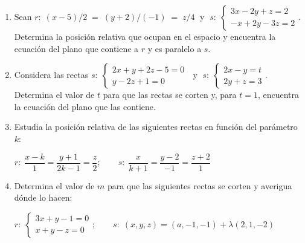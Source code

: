\begin{enumerate}
\vspace{2mm} 


\item Sean $r:\; (x-5)/2\;=\;(y+2)/(-1)\;=\;z/4\;$ y $\;s:\; \begin{cases} 3x-2y+z=2\\-x+2y-3z=2\end{cases}$. Determina la posición relativa que ocupan en el espacio y encuentra la ecuación del plano que contiene a $r$ y es paralelo a $s$.

\vspace{2mm} 

\item Considera las rectas $s:\; \begin{cases} 2x+y+2z-5=0\\y-2z+1=0\end{cases}\;$ y $\;s:\; \begin{cases} 2x-y=t\\2y+z=3\end{cases}$. Determina el valor de $t$ para que las rectas se corten y, para $t=1$, encuentra la ecuación del plano que las contiene.

\vspace{2mm} 

\item Estudia la posición relativa de las siguientes rectas en función del parámetro $k$:

$r:\; \dfrac{x-k}{1}=\dfrac{y+1}{2k-1}=\dfrac{z}{2};\qquad s:\; \dfrac{x}{k+1}=\dfrac{y-2}{-1}=\dfrac{z+2}{1}$

\vspace{2mm} 

\item Determina el valor de $m$ para que las siguientes rectas se corten y averigua dónde lo hacen:

$r:\; \begin{cases}3x+y-1=0\\x+y-z=0\end{cases}; \qquad s:\; (x,y,z)=(a,-1,-1)+\lambda(2,1,-2)$


\end{enumerate}
